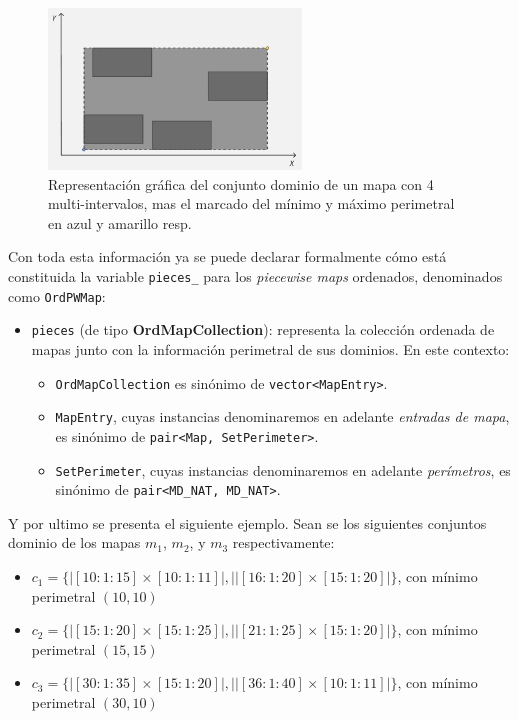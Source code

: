 \begin{figure}[ht]
  \centering
  \includegraphics[width=0.6\textwidth]{figures/Orden/image.png}
  \caption{Representación gráfica del conjunto dominio de un mapa con 4 multi-intervalos, mas el marcado del mínimo y máximo perimetral en azul y amarillo resp.}
  \label{fig:minmaxPer1}
\end{figure}


Con toda esta información ya se puede declarar formalmente cómo está constituida la variable \texttt{pieces\_} para los \textit{piecewise maps} ordenados, denominados como \texttt{OrdPWMap}:

\begin{itemize}
  \item \texttt{pieces} (de tipo \textbf{OrdMapCollection}): 
  representa la colección ordenada de mapas junto con la información perimetral 
  de sus dominios.  
  En este contexto:
  \begin{itemize}
    \item \texttt{OrdMapCollection} es sinónimo de \texttt{vector<MapEntry>}.
    \item \texttt{MapEntry}, cuyas instancias denominaremos en adelante \textit{entradas de mapa}, es sinónimo de \texttt{pair<Map, SetPerimeter>}.
    \item \texttt{SetPerimeter}, cuyas instancias denominaremos en adelante \textit{perímetros}, es sinónimo de \texttt{pair<MD\_NAT, MD\_NAT>}.
  \end{itemize}
\end{itemize}


Y por ultimo se presenta el siguiente ejemplo. Sean se los siguientes conjuntos dominio de los mapas $m_1$, $m_2$, y $m_3$ respectivamente:

\begin{itemize}
    \item $c_1 = \{|[10:1:15]\times[10:1:11]|,||[16:1:20]\times[15:1:20]|\}$, con mínimo perimetral $(10,10)$
    \item $c_2 = \{|[15:1:20]\times[15:1:25]|,||[21:1:25]\times[15:1:20]|\}$, con mínimo perimetral $(15,15)$
    \item $c_3 = \{|[30:1:35]\times[15:1:20]|,||[36:1:40]\times[10:1:11]|\}$, con mínimo perimetral $(30,10)$
\end{itemize}

